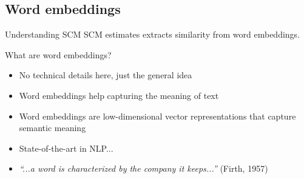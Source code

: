 \documentclass[handout]{beamer}
\begin{document}
\subsection{Word embeddings}

\begin{frame}{Understanding SCM}
SCM estimates extracts similarity from \alert{word embeddings}. 
	\begin{block}{What are word embeddings?}
		\begin{itemize}[<+>]
			\item No technical details here, just the general idea
			\item Word embeddings help capturing the meaning of text
			\item Word embeddings are low-dimensional vector representations that capture semantic meaning
			\item State-of-the-art in NLP...
			\item \emph{``...a word is characterized by the company it keeps...''} (Firth, 1957)
		\end{itemize}
	\end{block}
\end{frame}

\iffalse
\begin{frame}{}
\end{frame}

\begin{frame}{}
\end{frame}
\end{document}
